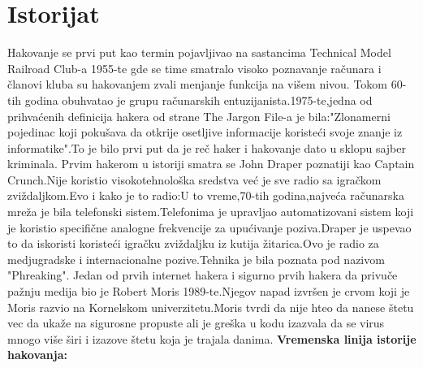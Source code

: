 \documentclass[a4paper]{article}
\begin{document}
\section{Istorijat}
Hakovanje se prvi put kao termin pojavljivao na sastancima Technical Model Railroad Club-a 1955-te gde se time smatralo visoko poznavanje računara i članovi kluba su hakovanjem zvali menjanje funkcija na višem nivou.
\newline
Tokom 60-tih godina obuhvatao je grupu računarskih entuzijanista.1975-te,jedna od prihvaćenih definicija hakera od strane The Jargon File-a je bila:"Zlonamerni pojedinac koji pokušava da otkrije osetljive informacije koristeći svoje znanje iz informatike".To je bilo prvi put da je reč haker i hakovanje dato u sklopu sajber kriminala.
\newline
Prvim hakerom u istoriji smatra se John Draper poznatiji kao Captain Crunch.Nije koristio visokotehnološka sredstva već je sve radio sa igračkom zviždaljkom.Evo i kako je to radio:U to vreme,70-tih godina,najveća računarska mreža je bila telefonski sistem.Telefonima je upravljao automatizovani sistem koji je koristio specifične  analogne frekvencije za upućivanje poziva.Draper je uspevao to da iskoristi koristeći igračku zviždaljku iz kutija žitarica.Ovo je radio za medjugradske i internacionalne pozive.Tehnika je bila poznata pod nazivom "Phreaking".
\newline
Jedan od prvih internet hakera i sigurno prvih hakera da privuče pažnju medija bio je Robert Moris 1989-te.Njegov napad izvršen je crvom koji je Moris razvio na Kornelskom univerzitetu.Moris tvrdi da nije hteo da nanese štetu vec da ukaže na sigurosne propuste ali je greška u kodu izazvala da se virus mnogo više širi i izazove štetu koja je trajala danima. \textbf{Vremenska linija istorije hakovanja:}
\end{document}
